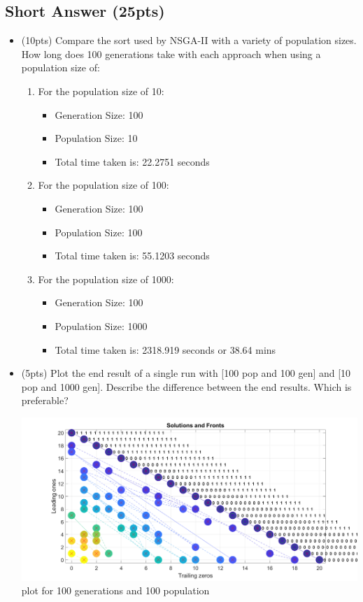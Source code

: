 \documentclass[11pt, a4paper]{article}
\begin{document}
\subsection{Short Answer (25pts)}
\begin{itemize}
	\item (10pts) Compare the sort used by NSGA-II with a variety of population sizes. How long does 100 generations take with each approach when using a population size of:
	\begin{enumerate}
		 \item For the population size of 10:
		 \begin{itemize}
		 	\item Generation Size: 100
		 	\item Population Size: 10
		 	\item Total time taken is: 22.2751 seconds
		 \end{itemize}
		 
		 \item For the population size of 100:
		 \begin{itemize}
		 	\item Generation Size: 100
		 	\item Population Size: 100
		 	\item Total time taken is: 55.1203 seconds
		 \end{itemize}
		 
		 \item For the population size of 1000:
		 \begin{itemize}
		 	\item Generation Size: 100
		 	\item Population Size: 1000
		 	\item Total time taken is: 2318.919 seconds or 38.64 mins
		 \end{itemize}
	\end{enumerate}
	\item (5pts) Plot the end result of a single run with [100 pop and 100 gen] and [10 pop and 1000 gen]. Describe the difference between the end results. Which is preferable?
	\begin{center}
		\centering
		\includegraphics[width=\textwidth]{code/final_plot_100pop100gen}
		\\ plot for 100 generations and 100 population
		\label{finalplot100pop1000gen}
	\end{center}


\end{itemize}
\end{document}
